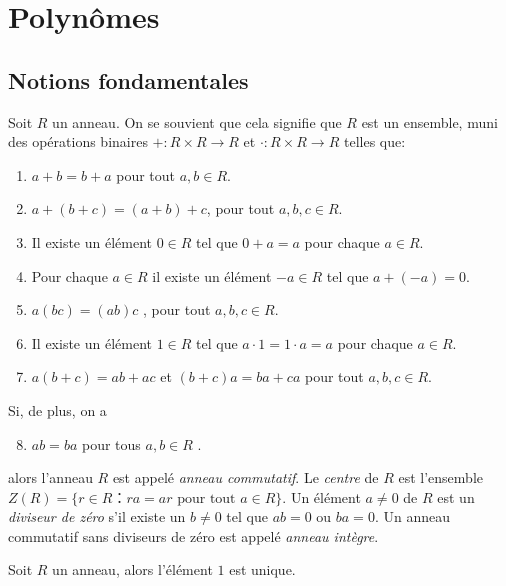 
\chapter{Polynômes}
\label{cha:polynomes}

\section{Notions fondamentales}
\label{sec:noti-fond}


Soit $R$ un anneau. On se souvient que cela signifie que  $R$ est un ensemble,  muni des opérations binaires  $+ : R × R → R$  et $⋅: R × R → R$ telles que: 
\begin{enumerate}[(R1)]
\item $a+ b  = b+a$ pour tout     $a,b ∈ R$. \label{R1}
\item $a + (b+c) = (a + b) +c$, pour tout $a,b,c ∈ R$. \label{R2}
\item Il existe un élément $0 ∈R$ tel que $0+a =a$ pour chaque $a ∈R$. \label{R3}
\item Pour chaque $a ∈R$ il existe un élément $-a ∈R$ tel que $a + (-a) = 0$. \label{R4}
\item $a(bc) = (ab) c$ , pour tout $a,b,c ∈ R$. \label{R5}
\item Il existe un élément $1 ∈R$ tel que $a ⋅ 1 = 1 ⋅a = a$ pour chaque $a ∈R$. \label{R6}
\item $a (b+c) = ab + ac$ et $(b+c) a =ba +ca$  pour tout $a,b,c ∈R$.\label{R7} 
\end{enumerate}
Si, de plus, on a 
\begin{enumerate}[(R1)]
  \setcounter{enumi}{7}
\item  $a b = ba$ pour tous $a,b ∈R$ \label{R8}. 
\end{enumerate}
alors l'anneau $R$ est appelé \emph{anneau commutatif}. Le \emph{centre} de $R$ est l'ensemble $Z(R) = \{ r ∈ R ： ra = ar \text{ pour tout } a ∈ R\}$. 
Un élément  $a ≠0$ de $R$ est un \emph{diviseur de zéro} s'il existe un $b≠0$ tel que $ab = 0$ ou $ba = 0$. Un anneau commutatif sans diviseurs de zéro est appelé \emph{anneau intègre}.  



\begin{exercise}
  Soit $R$ un anneau, alors l'élément $1$ est unique. 
\end{exercise}




